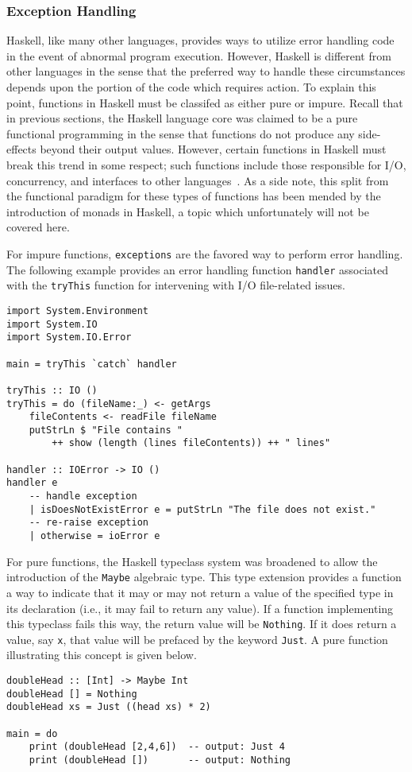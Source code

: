 \documentclass[titlepage,12pt]{article}
\begin{document}
\subsubsection{Exception Handling}

Haskell, like many other languages, provides ways to utilize error handling code
in the event of abnormal program execution.  However, Haskell is
different from other languages in the sense that the preferred way to handle
these circumstances depends upon the portion of the code which requires action.
To explain this point, functions in Haskell must be classifed as either pure
or impure.  Recall that in previous sections, the Haskell language core was
claimed to be a pure functional programming in the sense that functions do
not produce any side-effects beyond their output values.  However, certain
functions in Haskell must break this trend in some respect; such functions include
those responsible for I/O, concurrency, and interfaces to other languages~\cite{haskell-awkward-squad}.
As a side note, this split from the functional paradigm for these types of functions has
been mended by the introduction of monads in Haskell, a topic which unfortunately will not be covered here.

For impure functions, \texttt{exceptions} are the favored way to perform error handling.
The following example provides an error handling function \texttt{handler} associated with the
\texttt{tryThis} function for intervening with I/O file-related issues.

\begin{verbatim}
import System.Environment  
import System.IO  
import System.IO.Error  
      
main = tryThis `catch` handler  
                  
tryThis :: IO ()  
tryThis = do (fileName:_) <- getArgs  
    fileContents <- readFile fileName  
    putStrLn $ "File contains "
        ++ show (length (lines fileContents)) ++ " lines"  
      
handler :: IOError -> IO ()  
handler e 
    -- handle exception
    | isDoesNotExistError e = putStrLn "The file does not exist."  
    -- re-raise exception
    | otherwise = ioError e  
\end{verbatim}

For pure functions, the Haskell typeclass system was broadened to allow the introduction
of the \texttt{Maybe} algebraic type.  This type extension provides a function a way to
indicate that it may or may not return a value of the specified type in its declaration
(i.e., it may fail to return any value).  If a function implementing this typeclass
fails this way, the return value will be \texttt{Nothing}.  If it does return a value, say \texttt{x},
that value will be prefaced by the keyword \texttt{Just}.  A pure function illustrating this concept
is given below.
\begin{verbatim}
doubleHead :: [Int] -> Maybe Int
doubleHead [] = Nothing
doubleHead xs = Just ((head xs) * 2)

main = do
    print (doubleHead [2,4,6])  -- output: Just 4
    print (doubleHead [])       -- output: Nothing
\end{verbatim}
\end{document}
